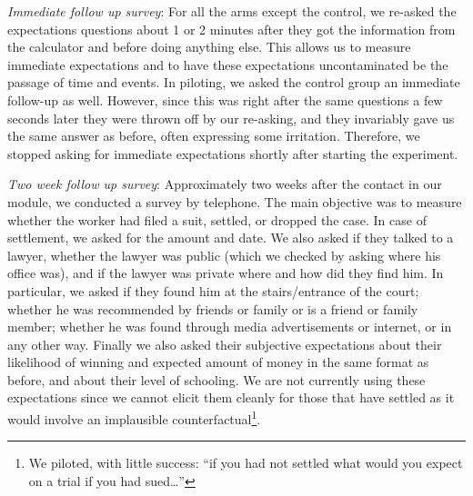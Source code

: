 \documentclass[oneside,12pt]{article}
\begin{document}
\emph{Immediate follow up survey}: For all the arms except the control, we re-asked the expectations questions about 1 or 2 minutes after they got the information from the calculator and before doing anything else. This allows us to measure immediate expectations and to have these expectations uncontaminated be the passage of time and events. In piloting, we asked the control group an immediate follow-up as well. However, since this was right after the same questions a few seconds later they were thrown off by our re-asking, and they invariably gave us the same answer as before, often expressing some irritation. Therefore, we stopped asking for immediate expectations shortly after starting the experiment.

\emph{Two week follow up survey}: Approximately two weeks after the contact in our module, we conducted a survey by telephone. The main objective was to measure whether the worker had filed a suit, settled, or dropped the case. In case of settlement, we asked for the amount and date. We also asked if they talked to a lawyer, whether the lawyer was public (which we checked by asking where his office was), and if the lawyer was private where and how did they find him. In particular, we asked if they found him at the stairs/entrance of the court; whether he was recommended by friends or family or is a friend or family member; whether he was found through media advertisements or internet, or in any other way. Finally we also asked their subjective expectations about their likelihood of winning and expected amount of money in the same format as before, and about their level of schooling. We are not currently using these expectations since we cannot elicit them cleanly for those that have settled as it would involve an implausible counterfactual\footnote{We piloted, with little success: “if you had not settled what would you expect on a trial if you had sued…”}. 
\end{document}

